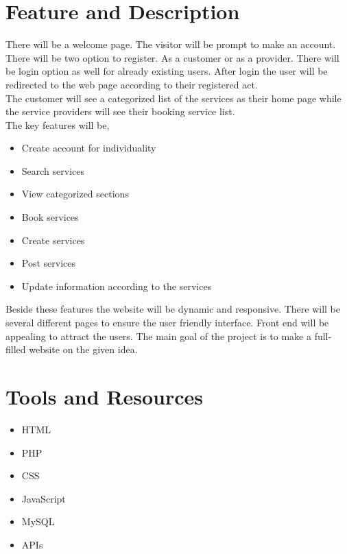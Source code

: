 \documentclass[14pt]{report}
\begin{document}
\section*{\LARGE Feature and Description}

\begin{Large}

There will be a welcome page. The visitor will be prompt to make an account. There will be two option to register. As a customer or as a provider. There will be login option as well for already existing users. After login the user will be redirected to the web page according to their registered act.\\
The customer will see a categorized list of the services as their home page while the service providers will see their booking service list.\\
The key features will be,

\begin{itemize}
\item Create account for individuality
\item Search services
\item View categorized sections
\item Book services
\item Create services
\item Post services
\item Update information according to the services
\end{itemize}
Beside these features the website will be dynamic and responsive.
There will be several different pages to ensure the user friendly interface. Front end will be appealing to attract the users. The main goal of the project is to make a full-filled website on the given idea.

\end{Large}

\section*{\LARGE Tools and Resources}

\begin{Large}
\begin{itemize}
\item HTML
\item PHP
\item CSS
\item JavaScript
\item MySQL
\item APIs
\end{itemize}
\end{Large}
\end{document}
